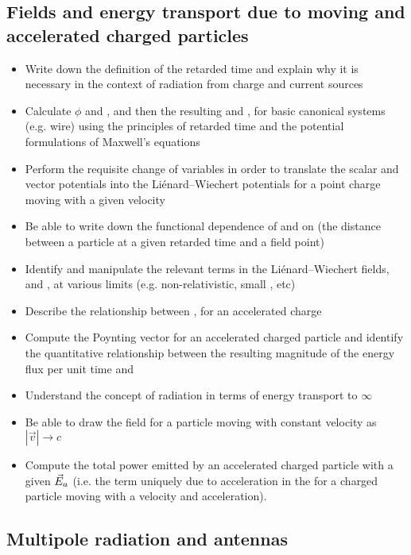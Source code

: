 \documentclass[12pt]{article}
\begin{document}
\subsection*{Fields and energy transport due to moving and accelerated charged particles}

\begin{itemize}  
  \item Write down the definition of the retarded time and explain why it is necessary in the context of radiation from charge and current sources
  \item Calculate $\phi$ and \Avec, and then the resulting \Evec and \Bvec, for basic canonical systems (e.g. wire) using the principles of retarded time and the potential formulations of Maxwell's equations
  \item Perform the requisite change of variables in order to translate the scalar and vector potentials into the Li\'enard--Wiechert potentials for a point charge moving with a given velocity 
  \item Be able to write down the functional dependence of \Evec and \Bvec on \Rvec (the distance between a particle at a given retarded time and a field point)
  \item Identify and manipulate the relevant terms in the Li\'enard--Wiechert fields, \Evec and \Bvec, at various limits (e.g. non-relativistic, small \avec, etc)
  \item Describe the relationship between \Evec, \Bvec for an accelerated charge
  \item Compute the Poynting vector for an accelerated charged particle and identify the quantitative relationship between the resulting magnitude of the energy flux per unit time and \Rvec
  \item Understand the concept of radiation in terms of energy transport to $\infty$
  \item Be able to draw the \Evec field for a particle moving with constant velocity as $|\vec{v}|\rightarrow c$
  \item Compute the total power emitted by an accelerated charged particle with a given $\vec{E}_{a}$ (i.e. the term uniquely due  to acceleration in the \Evec for a charged particle moving with a velocity and acceleration). 
\end{itemize}

\subsection*{Multipole radiation and antennas}
\end{document}
